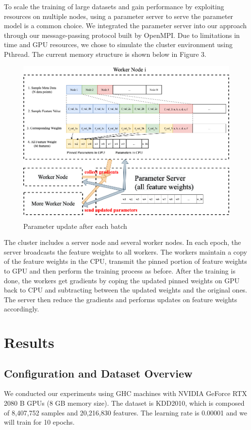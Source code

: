 \documentclass{article}
\begin{document}
To scale the training of large datasets and gain performance by exploiting resources on multiple nodes, using a parameter server to serve the parameter model is a common choice. We integrated the parameter server into our approach through our message-passing protocol built by OpenMPI. Due to limitations in time and GPU resources, we chose to simulate the cluster environment using Pthread. The current memory structure is shown below in Figure 3.

\begin{figure}[htp]
    \centering
    \includegraphics[width=14cm]{parameter_server.png}
    \caption{Parameter update after each batch}
\end{figure}

The cluster includes a server node and several worker nodes. In each epoch, the server broadcasts the feature weights to all workers. The workers maintain a copy of the feature weights in the CPU, transmit the pinned portion of feature weights to GPU and then perform the training process as before. After the training is done, the workers get gradients by coping the updated pinned weights on GPU back to CPU and subtracting between the updated weights and the original ones. The server then reduce the gradients and performs updates on feature weights accordingly. 

\section*{Results}
\subsection*{Configuration and Dataset Overview}
We conducted our experiments using GHC machines with NVIDIA GeForce RTX 2080 B GPUs (8 GB memory size). The dataset is KDD2010, which is composed of 8,407,752 samples and 20,216,830 features. The learning rate is 0.00001 and we will train for 10 epochs.
\end{document}

